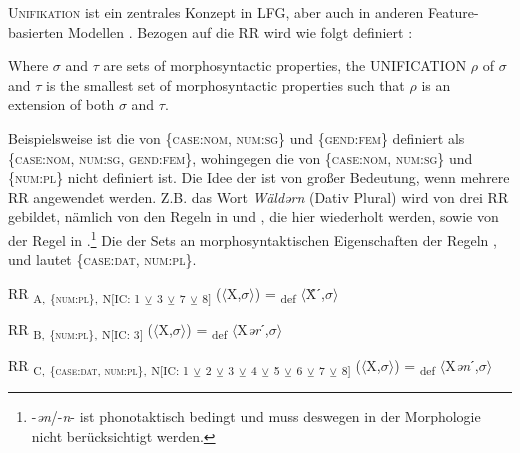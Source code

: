 \textsc{Unifikation} ist ein zentrales Konzept in LFG, aber auch in anderen Feature-basierten Modellen \citep[17]{Falk2001}. Bezogen auf die RR wird  wie folgt definiert :

\ea%
    \label{ex:key:19}
Where $\sigma $ and $\tau $ are  sets of morphosyntactic properties, the UNIFICATION $\rho $ of $\sigma $ and $\tau $ is the smallest  set of morphosyntactic properties such that $\rho $ is an extension of both $\sigma $ and $\tau $. \citep[41]{Stump2001}
    \z

Beispielsweise ist die  von \{\textsc{case:nom}, \textsc{num:sg}\} und \{\textsc{gend:fem}\} definiert als \{\textsc{case:nom}, \textsc{num:sg}, \textsc{gend:fem}\}, wohingegen die  von \{\textsc{case:\linebreak nom}, \textsc{num:sg}\} und \{\textsc{num:pl}\} nicht definiert ist. Die Idee der  ist von großer Bedeutung, wenn mehrere RR angewendet werden. Z.B. das Wort \textit{Wäldərn} (Dativ Plural) wird von drei RR gebildet, nämlich von den Regeln in  und , die hier wiederholt werden, sowie von der Regel in .\footnote{-\textit{ən}/-\textit{n}- ist phonotaktisch bedingt und muss deswegen in der Morphologie nicht berücksichtigt werden.} Die  der Sets an morphosyntaktischen Eigenschaften der Regeln ,  und  lautet \{\textsc{case:dat}, \textsc{num:pl}\}.

\begin{exe}
 RR \textsubscript{A,} \textsubscript{\{\textsc{num:pl}\},} \textsubscript{N[IC: 1} \textsubscript{${\veebar}$}\textsubscript{ 3} \textsubscript{${\veebar}$}\textsubscript{ 7} \textsubscript{${\veebar}$}\textsubscript{ 8]} ($\langle$X,$\sigma$$\rangle$) = \textsubscript{def} $\langle$Ẍˊ,$\sigma$$\rangle$
\end{exe}

\begin{exe}
RR \textsubscript{B,} \textsubscript{\{\textsc{num:pl}\},} \textsubscript{N[IC: 3]} ($\langle$X,$\sigma$$\rangle$) = \textsubscript{def} $\langle$X\textit{ər}ˊ,$\sigma$$\rangle$
\end{exe}

\ea%
    \label{ex:key:20}
  RR \textsubscript{C,} \textsubscript{\{\textsc{case:dat}, \textsc{num:pl}\},} \textsubscript{N[IC: 1} \textsubscript{${\veebar}$}\textsubscript{ 2} \textsubscript{${\veebar}$}\textsubscript{ 3} \textsubscript{${\veebar}$}\textsubscript{ 4} \textsubscript{${\veebar}$}\textsubscript{ 5} \textsubscript{${\veebar}$}\textsubscript{ 6} \textsubscript{${\veebar}$}\textsubscript{ 7} \textsubscript{${\veebar}$}\textsubscript{ 8]} ($\langle$X,$\sigma$$\rangle$) = \textsubscript{def} $\langle$X\textit{ən}ˊ,$\sigma$$\rangle$
\z

